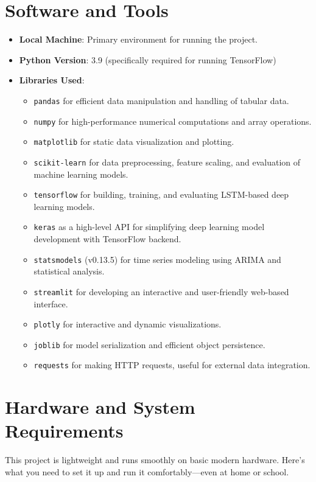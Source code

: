 \section{Software and Tools}
\begin{itemize}
	\item \textbf{Local Machine}: Primary environment for running the project.
	\item \textbf{Python Version}: 3.9 (specifically required for running TensorFlow)
	\item \textbf{Libraries Used}:
	\begin{itemize}
		\item \texttt{pandas} for efficient data manipulation and handling of tabular data.
		\item \texttt{numpy} for high-performance numerical computations and array operations.
		\item \texttt{matplotlib} for static data visualization and plotting.
		\item \texttt{scikit-learn} for data preprocessing, feature scaling, and evaluation of machine learning models.
		\item \texttt{tensorflow} for building, training, and evaluating LSTM-based deep learning models.
		\item \texttt{keras} as a high-level API for simplifying deep learning model development with TensorFlow backend.
		\item \texttt{statsmodels} (v0.13.5) for time series modeling using ARIMA and statistical analysis.
		\item \texttt{streamlit} for developing an interactive and user-friendly web-based interface.
		\item \texttt{plotly} for interactive and dynamic visualizations.
		\item \texttt{joblib} for model serialization and efficient object persistence.
		\item \texttt{requests} for making HTTP requests, useful for external data integration.
	\end{itemize}
\end{itemize}

\section{Hardware and System Requirements}

This project is lightweight and runs smoothly on basic modern hardware. Here's what you need to set it up and run it comfortably—even at home or school.

